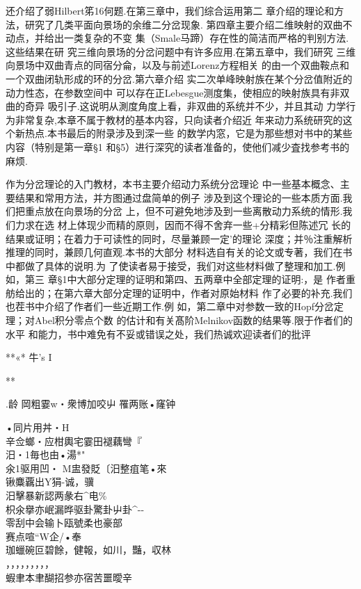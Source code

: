\documentclass{article}
\begin{document}
还介绍了弱Hilbert笫16何题.在第三章中，我们综合运用第二
章介绍的理论和方法，研究了几类平面向景场的余维二分岔现象.
第四章主要介绍二维映射的双曲不动点，并给出一类复杂的不变
集（Smale马蹄）存在性的简洁而严格的判别方法.这些结果在研
究三维向景场的分岔问题中有许多应用.在第五章中，我们研究
三维向景场中双曲青点的同宿分侖，以及与前述Lorenz方程相关
的由一个双曲鞍点和一个双曲闭轨形成的环的分岔.第六章介绍
实二次单峰映射族在某个分岔值附近的动力性态，在参数空间中
可以存在正Lebesgue测度集，使相应的映射族具有非双曲的奇异
吸引子.这说明从測度角度上看，非双曲的系统并不少，并且其动
力学行为非常复杂,本章不属于教材的基本内容，只向读者介绍近
年来动力系统研究的这个新热点.本书最后的附录涉及到深一些
的数学内窓，它是为那些想对书中的某些内容（特别是第一章§1
和§5）进行深究的读者准备的，使他们减少査找参考书的麻烦.

作为分岔理论的入门教材，本书主要介绍动力系统分岔理论
中一些基本概念、主要结果和常用方法，并方图通过盘简单的例子
涉及到这个理论的一些本质方面.我们把重点放在向景场的分岔
上，但不可避免地涉及到一些离散动力系统的情形.我们力求在选
材上体现少而精的原则，因而不得不舍弃一些+分精彩但陈述冗
长的结果或证明；在着力于可读性的同时，尽量兼顾一定'的理论
深度；并％注重解析推理的同时，兼顾几何直观.本书的大部分
材料选自有关的论文或专著，我们在书中都做了具体的说明.为
了使读者易于接受，我们对这些材料做了整理和加工.例如，第三
章§1中大部分定理的证明和第四、五两章中全部定理的证明:，是
作者重舫给出的；在第六章大部分定理的证明中，作者对原始材料
作了必要的补充.我们也茬书中介绍了作者们一些近期工作.例
如，第二章中对参数一致的Hopf分岔定理；对Abel积分零点个数
的估计和有关髙阶Melnikov函数的结果等.限于作者们的水平
和能力，书中难免有不妥或错误之处，我们热诚欢迎读者们的批评

**«* 牛's I

**

.龄 岡粗霎w・衆博加咬屮 罹两账•窿钟

•同片用丼・H\\
辛佥螂・应柑輿宅霎田褪藕彎『\\
汨・1毎也由•湯*"\\
氽1驱用凹・ M盅發貶〔汨整疽笔•來\\
锹麋覊出Y狷-诚，骥\\
汨擊暴新認两彖右\^{}电\%\\
枳氽擧亦岷漏晔驱卦驚卦屮卦\^{}-\/-\\
零刮中会输卜瓯號柔也豪部\\
赛点喧``W企/•奉\\
珈蠟碗叵碧餘，健報，如川，豔，収林\\
，，，，，，，，，\\
蝦聿本聿醐招参亦宿苦噩曖辛
\end{document}
